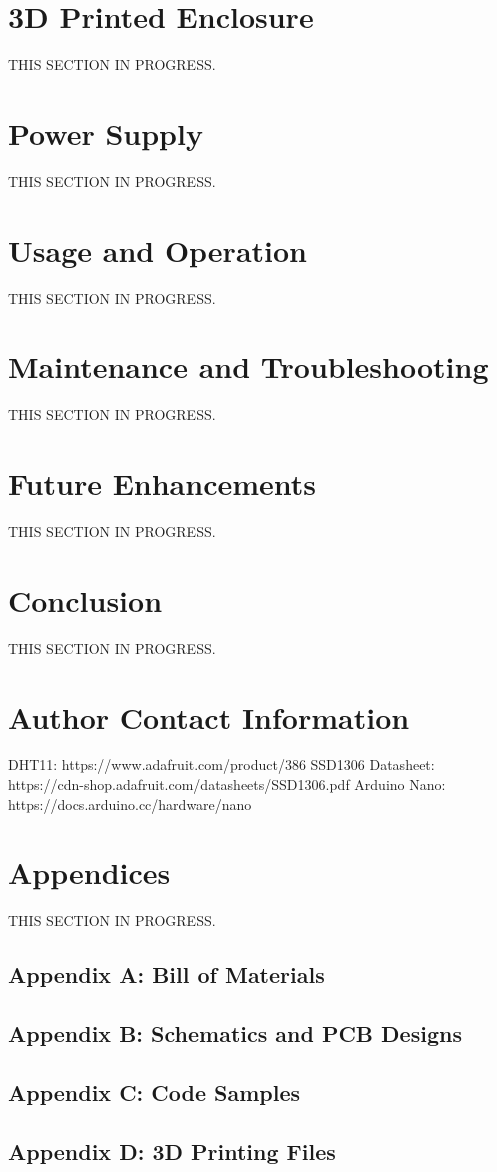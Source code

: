 \documentclass{article}
\begin{document}
\begin{multicols}{2}
		\section{3D Printed Enclosure}
		THIS SECTION IN PROGRESS.
		
		\section{Power Supply}
		THIS SECTION IN PROGRESS.
		
		\section{Usage and Operation}
		THIS SECTION IN PROGRESS.
		
		\section{Maintenance and Troubleshooting}
		THIS SECTION IN PROGRESS.
		
		\section{Future Enhancements}
		THIS SECTION IN PROGRESS.
		
		\section{Conclusion}
		THIS SECTION IN PROGRESS.
	
		\section{Author Contact Information}
		
\end{multicols} %

\begin{thebibliography}{X}
	 DHT11: https://www.adafruit.com/product/386
	 SSD1306 Datasheet: https://cdn-shop.adafruit.com/datasheets/SSD1306.pdf
	 Arduino Nano: https://docs.arduino.cc/hardware/nano
\end{thebibliography}	
	
		\section{Appendices}
		THIS SECTION IN PROGRESS.
		
		\subsection{Appendix A: Bill of Materials}
		
		\subsection{Appendix B: Schematics and PCB Designs}
		
		\subsection{Appendix C: Code Samples}
		
		\subsection{Appendix D: 3D Printing Files}
	
\end{document}
